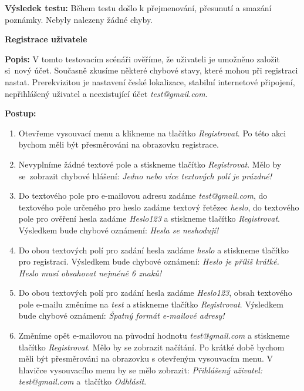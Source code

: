 \documentclass[czech, bc, kiv, he, iso690numb]{fasthesis}
\begin{document}
\noindent \textbf{Výsledek testu:} Během testu došlo k přejmenování, přesunutí a smazání poznámky. Nebyly nalezeny žádné chyby.


\noindent \textbf{Registrace uživatele}

\noindent \textbf{Popis:} V tomto testovacím scénáři ověříme, že uživateli je umožněno založit si~nový účet. Současně zkusíme některé chybové stavy, které mohou při registraci nastat. Prerekvizitou je nastavení české lokalizace, stabilní internetové připojení, nepřihlášený uživatel a neexistující účet \textit{test@gmail.com}.

\noindent \textbf{Postup:}

\begin{enumerate}[label=\arabic*., itemsep=0pt, topsep=0pt, parsep=0pt]
    \item Otevřeme vysouvací menu a klikneme na tlačítko \textit{Registrovat}. Po této akci bychom měli být přesměrováni na obrazovku registrace.
    \item Nevyplníme žádné textové pole a stiskneme tlačítko \textit{Registrovat}. Mělo by se~zobrazit chybové hlášení: \textit{Jedno nebo více textových polí je prázdné!}
    \item Do textového pole pro e-mailovou adresu zadáme \textit{test@gmail.com}, do textového pole určeného pro heslo zadáme textový řetězec \textit{heslo}, do textového pole pro ověření hesla zadáme \textit{Heslo123} a stiskneme tlačítko \textit{Registrovat}. Výsledkem bude chybové oznámení: \textit{Hesla se neshodují!}
    \item Do obou textových polí pro zadání hesla zadáme \textit{heslo} a stiskneme tlačítko pro registraci. Výsledkem bude chybové oznámení: \textit{Heslo je příliš krátké. Heslo musí obsahovat nejméně 6 znaků!}
    \item Do obou textových polí pro zadání hesla zadáme \textit{Heslo123}, obsah textového pole e-mailu změníme na \textit{test} a stiskneme tlačítko \textit{Registrovat}. Výsledkem bude chybové oznámení: \textit{Špatný formát e-mailové adresy!}
    \item Změníme opět e-mailovou na původní hodnotu \textit{test@gmail.com} a stiskneme tlačítko \textit{Registrovat}. Mělo by se zobrazit načítání. Po krátké době bychom měli být přesměrováni na obrazovku s otevřeným vysouvacím menu. V hlavičce vysouvacího menu by se mělo zobrazit: \textit{Přihlášený uživatel: test@gmail.com} a~tlačítko \textit{Odhlásit}.
\end{enumerate}
\end{document}
